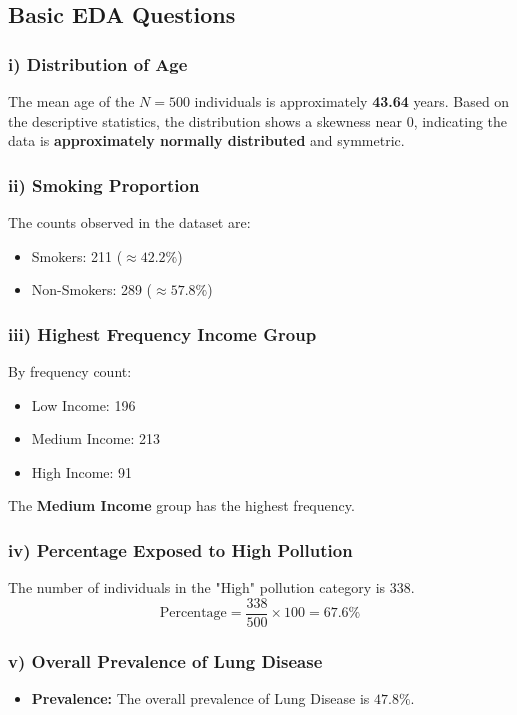 \documentclass[12pt]{article}
\begin{document}
\subsection{Basic EDA Questions}

\subsubsection{i) Distribution of Age}
The mean age of the $N=500$ individuals is approximately \textbf{43.64} years. Based on the descriptive statistics, the distribution shows a skewness near 0, indicating the data is \textbf{approximately normally distributed} and symmetric.

\subsubsection{ii) Smoking Proportion}
The counts observed in the dataset are:
\begin{itemize}
    \item Smokers: 211 ($\approx 42.2\%$)
    \item Non-Smokers: 289 ($\approx 57.8\%$)
\end{itemize}

\subsubsection{iii) Highest Frequency Income Group}
By frequency count:
\begin{itemize}
    \item Low Income: 196
    \item Medium Income: 213
    \item High Income: 91
\end{itemize}
The \textbf{Medium Income} group has the highest frequency.

\subsubsection{iv) Percentage Exposed to High Pollution}
The number of individuals in the "High" pollution category is 338.
\[ \text{Percentage} = \frac{338}{500} \times 100 = 67.6\% \]
\subsubsection{v) Overall Prevalence of Lung Disease}
\begin{itemize}
Prevalence is defined as the total number of cases divided by the total population:
\[ \text{Prevalence} = \frac{239}{500} = 0.478 \text{ (47.8\%)} \]
\item \textbf{Prevalence:} The overall prevalence of Lung Disease is $47.8\%$.
\end{itemize}
\end{document}
